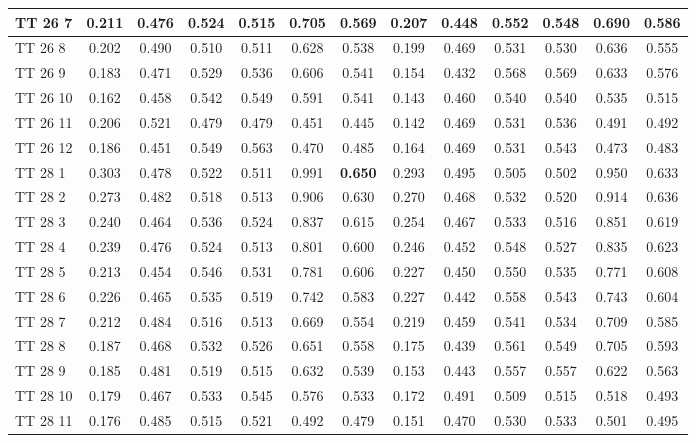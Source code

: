\documentclass{article}
\begin{document}
\begin{tabular}{|l|c|c|c|c|c|c||c|c|c|c|c|c|}
TT 26  7 & 0.211 & 0.476 & 0.524 & 0.515 & 0.705 & 0.569 & 0.207 & 0.448 & 0.552 & 0.548 & 0.690 & 0.586\\ \hline
TT 26  8 & 0.202 & 0.490 & 0.510 & 0.511 & 0.628 & 0.538 & 0.199 & 0.469 & 0.531 & 0.530 & 0.636 & 0.555\\ \hline
TT 26  9 & 0.183 & 0.471 & 0.529 & 0.536 & 0.606 & 0.541 & 0.154 & 0.432 & 0.568 & 0.569 & 0.633 & 0.576\\ \hline
TT 26 10 & 0.162 & 0.458 & 0.542 & 0.549 & 0.591 & 0.541 & 0.143 & 0.460 & 0.540 & 0.540 & 0.535 & 0.515\\ \hline
TT 26 11 & 0.206 & 0.521 & 0.479 & 0.479 & 0.451 & 0.445 & 0.142 & 0.469 & 0.531 & 0.536 & 0.491 & 0.492\\ \hline
TT 26 12 & 0.186 & 0.451 & 0.549 & 0.563 & 0.470 & 0.485 & 0.164 & 0.469 & 0.531 & 0.543 & 0.473 & 0.483\\ \hline
TT 28  1 & 0.303 & 0.478 & 0.522 & 0.511 & 0.991 & \textbf{0.650} & 0.293 & 0.495 & 0.505 & 0.502 & 0.950 & 0.633\\ \hline
TT 28  2 & 0.273 & 0.482 & 0.518 & 0.513 & 0.906 & 0.630 & 0.270 & 0.468 & 0.532 & 0.520 & 0.914 & 0.636\\ \hline
TT 28  3 & 0.240 & 0.464 & 0.536 & 0.524 & 0.837 & 0.615 & 0.254 & 0.467 & 0.533 & 0.516 & 0.851 & 0.619\\ \hline
TT 28  4 & 0.239 & 0.476 & 0.524 & 0.513 & 0.801 & 0.600 & 0.246 & 0.452 & 0.548 & 0.527 & 0.835 & 0.623\\ \hline
TT 28  5 & 0.213 & 0.454 & 0.546 & 0.531 & 0.781 & 0.606 & 0.227 & 0.450 & 0.550 & 0.535 & 0.771 & 0.608\\ \hline
TT 28  6 & 0.226 & 0.465 & 0.535 & 0.519 & 0.742 & 0.583 & 0.227 & 0.442 & 0.558 & 0.543 & 0.743 & 0.604\\ \hline
TT 28  7 & 0.212 & 0.484 & 0.516 & 0.513 & 0.669 & 0.554 & 0.219 & 0.459 & 0.541 & 0.534 & 0.709 & 0.585\\ \hline
TT 28  8 & 0.187 & 0.468 & 0.532 & 0.526 & 0.651 & 0.558 & 0.175 & 0.439 & 0.561 & 0.549 & 0.705 & 0.593\\ \hline
TT 28  9 & 0.185 & 0.481 & 0.519 & 0.515 & 0.632 & 0.539 & 0.153 & 0.443 & 0.557 & 0.557 & 0.622 & 0.563\\ \hline
TT 28 10 & 0.179 & 0.467 & 0.533 & 0.545 & 0.576 & 0.533 & 0.172 & 0.491 & 0.509 & 0.515 & 0.518 & 0.493\\ \hline
TT 28 11 & 0.176 & 0.485 & 0.515 & 0.521 & 0.492 & 0.479 & 0.151 & 0.470 & 0.530 & 0.533 & 0.501 & 0.495\\ \hline

\end{tabular}
\end{document}
